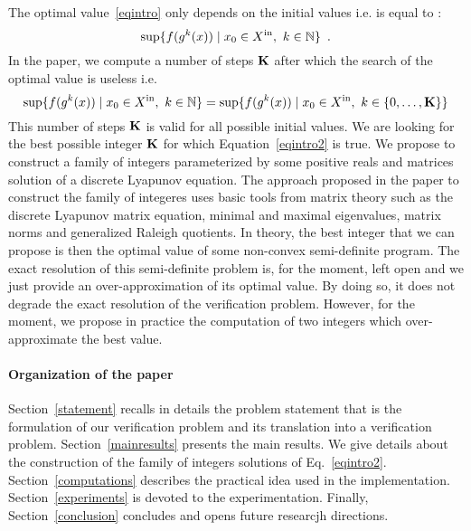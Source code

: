 \documentclass[10pt]{article}
\begin{document}
The optimal value~\eqref{eqintro} only depends on the initial values i.e. is equal to :
\[
\sup\{f( g^k (x))\mid  x_0\in X^\mathrm{in},\ k\in\mathbb{N}\}\enspace.
\]
In the paper, we compute a number of steps $\mathbf{K}$ after which the search of the optimal value is useless i.e.
 \begin{equation}
\label{eqintro2}
\sup\{f( g^k (x))\mid  x_0\in X^\mathrm{in},\ k\in\mathbb{N}\}=
\sup\{f( g^k (x))\mid  x_0\in X^\mathrm{in},\ k\in \{0,\ldots,\mathbf{K}\}\}
\end{equation}
This number of steps $\mathbf{K}$ is valid for all possible initial values. We are looking for the best possible integer $\mathbf{K}$ for which 
Equation~\eqref{eqintro2} is true. We propose to construct a family of integers parameterized by some positive reals and matrices solution of a discrete Lyapunov equation. The approach proposed in the paper to construct the family of integeres uses basic tools from matrix theory such as the discrete Lyapunov matrix equation, minimal and maximal eigenvalues, matrix norms and generalized Raleigh quotients. In theory, the best integer that we can propose is then the optimal value of some non-convex semi-definite program.  
The exact resolution of this semi-definite problem is, for the moment, left open and we just provide an over-approximation of its optimal value. By doing so, it does not degrade the exact resolution of the verification problem.   However, for the moment, we propose in practice the computation of two integers which over-approximate the best value. 
%

\paragraph{Organization of the paper}
Section~\ref{statement} recalls in details the problem statement that is the formulation of our verification problem and its translation into a verification problem. Section~\ref{mainresults} presents the main results. We give details about the construction of the family of integers solutions of Eq.~\eqref{eqintro2}. Section~\ref{computations} describes the practical idea used in the implementation.  Section~\ref{experiments} is devoted to the experimentation. Finally, Section~\ref{conclusion} concludes and opens future researcjh directions.
\end{document}
